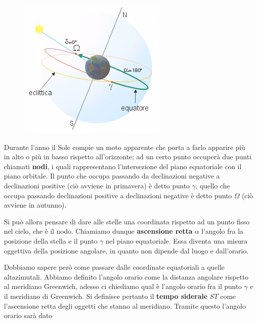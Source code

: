 \begin{minipage}{0.345\textwidth}
    \begin{figure}[H]
        \centering
        \includegraphics[width=5 cm]{immagini/coordinate_equatoriali.png}
    \end{figure}
\end{minipage}
\begin{minipage}{0.65\textwidth}
    \vspace{0.3cm}Durante l'anno il Sole compie un moto apparente che porta a farlo apparire più in alto o più in basso rispetto all'orizzonte; ad un certo punto occuperà due punti chiamati \textbf{nodi}, i quali rappresentano l'intersezione del piano equatoriale con il piano orbitale\footnotemark. Il punto che occupa passando da declinazioni negative a declinazioni positive (ciò avviene in primavera) è detto punto $\gamma$, quello che occupa passando declinazioni positive a declinazioni negative è detto punto $\Omega$ (ciò avviene in autunno).
\end{minipage}


\vspace{0.3cm}Si può allora pensare di dare alle stelle una coordinata rispetto ad un punto fisso nel cielo, che è il nodo. Chiamiamo dunque \textbf{ascensione retta} $\alpha$ l'angolo fra la posizione della stella e il punto $\gamma$ nel piano equatoriale. Essa diventa una misura oggettiva della posizione angolare, in quanto non dipende dal luogo e dall'orario.

\vspace{0.2cm}Dobbiamo sapere però come passare dalle coordinate equatoriali a quelle altazimutali. Abbiamo definito l'angolo orario come la distanza angolare rispetto al meridiano Greenwich, adesso ci chiediamo qual è l'angolo orario fra il punto $\gamma$ e il meridiano di Greenwich. Si definisce pertanto il \textbf{tempo siderale} $ST$ come l'ascensione retta degli oggetti che stanno al meridiano. Tramite questo l'angolo orario sarà dato

